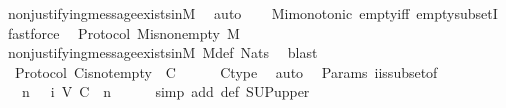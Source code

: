 \begin{isabellebody}
\ non{\isacharunderscore}justifying{\isacharunderscore}message{\isacharunderscore}exists{\isacharunderscore}in{\isacharunderscore}M{\isacharunderscore}{}\ \isamarkupfalse%
\ auto\isanewline
\ \ \isamarkupfalse%
\ Mi{\isacharunderscore}monotonic\ empty{\isacharunderscore}iff\ empty{\isacharunderscore}subsetI\ \isamarkupfalse%
\ fastforce%
\endisatagproof
{\isafoldproof}%
%
\isadelimproof
\isanewline
%
\endisadelimproof
\isanewline
{}\isamarkupfalse%
\ {\isacharparenleft}\ Protocol{\isacharparenright}\ Mis{\isacharunderscore}non{\isacharunderscore}empty{\isacharcolon}\ {\isachardoublequoteopen}M\ {\isasymnoteq}\ {\isasymemptyset}{\isachardoublequoteclose}\isanewline
%
\isadelimproof
\ \ %
\endisadelimproof
%
\isatagproof
{}\isamarkupfalse%
\ non{\isacharunderscore}justifying{\isacharunderscore}message{\isacharunderscore}exists{\isacharunderscore}in{\isacharunderscore}M{\isacharunderscore}{}\ M{\isacharunderscore}def\ Nats{\isacharunderscore}{}\ \isamarkupfalse%
\ blast%
\endisatagproof
{\isafoldproof}%
%
\isadelimproof
\isanewline
%
\endisadelimproof
\isanewline
{}\isamarkupfalse%
\ {\isacharparenleft}\ Protocol{\isacharparenright}\ C{\isacharunderscore}is{\isacharunderscore}not{\isacharunderscore}empty\ {\isacharcolon}\ {\isachardoublequoteopen}C\ {\isasymnoteq}\ {\isasymemptyset}{\isachardoublequoteclose}\isanewline
%
\isadelimproof
\ \ %
\endisadelimproof
%
\isatagproof
{}\isamarkupfalse%
\ C{\isacharunderscore}type\ \isamarkupfalse%
\ auto%
\endisatagproof
{\isafoldproof}%
%
\isadelimproof
\isanewline
%
\endisadelimproof
\isanewline
{}\isamarkupfalse%
\ {\isacharparenleft}\ Params{\isacharparenright}\ {\isasymSigma}i{\isacharunderscore}is{\isacharunderscore}subset{\isacharunderscore}of{\isacharunderscore}{\isasymSigma}\ {\isacharcolon}\isanewline
\ \ {\isachardoublequoteopen}{\isasymforall}\ n\ {\isasymin}\ {\isasymnat}{\isachardot}\ {\isasymSigma}i\ {\isacharparenleft}V{\isacharcomma}\ C{\isacharcomma}\ {\isasymepsilon}{\isacharparenright}\ n\ {\isasymsubseteq}\ {\isasymSigma}{\isachardoublequoteclose}\isanewline
%
\isadelimproof
\ \ %
\endisadelimproof
%
\isatagproof
{}\isamarkupfalse%
\ {\isacharparenleft}simp\ add{\isacharcolon}\ {\isasymSigma}{\isacharunderscore}def\ SUP{\isacharunderscore}upper{\isacharparenright}%
\endisatagproof
{\isafoldproof}%
%
\isadelimproof
\isanewline
%
\endisadelimproof

\end{isabellebody}
